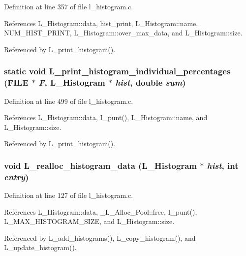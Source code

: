 Definition at line 357 of file l\_\-histogram.c.

References L\_\-Histogram::data, hist\_\-print, L\_\-Histogram::name, NUM\_\-HIST\_\-PRINT, L\_\-Histogram::over\_\-max\_\-data, and L\_\-Histogram::size.

Referenced by L\_\-print\_\-histogram().
\subsubsection{\setlength{\rightskip}{0pt plus 5cm}static void L\_\-print\_\-histogram\_\-individual\_\-percentages (FILE $\ast$ {\em F}, \bf{L\_\-Histogram} $\ast$ {\em hist}, double {\em sum})\hspace{0.3cm}{\tt  [static]}}\label{l__histogram_8c_f579e94ebf046b4687fbf55498d2e393}




Definition at line 499 of file l\_\-histogram.c.

References L\_\-Histogram::data, I\_\-punt(), L\_\-Histogram::name, and L\_\-Histogram::size.

Referenced by L\_\-print\_\-histogram().
\subsubsection{\setlength{\rightskip}{0pt plus 5cm}void L\_\-realloc\_\-histogram\_\-data (\bf{L\_\-Histogram} $\ast$ {\em hist}, int {\em entry})}\label{l__histogram_8c_6f58af10cab84e0960b7fa00f88908a1}




Definition at line 127 of file l\_\-histogram.c.

References L\_\-Histogram::data, \_\-L\_\-Alloc\_\-Pool::free, I\_\-punt(), L\_\-MAX\_\-HISTOGRAM\_\-SIZE, and L\_\-Histogram::size.

Referenced by L\_\-add\_\-histograms(), L\_\-copy\_\-histogram(), and L\_\-update\_\-histogram().
